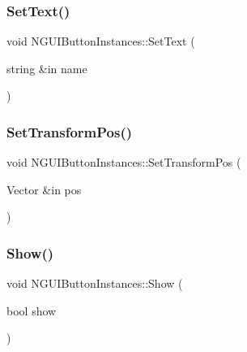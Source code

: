 \hypertarget{class_n_g_u_i_button_instances_af2efec3abac4dab2d8021a1288b4c5eb}{}\label{class_n_g_u_i_button_instances_af2efec3abac4dab2d8021a1288b4c5eb} 
\subsubsection{\texorpdfstring{Set\+Text()}{SetText()}}
{\footnotesize\ttfamily void N\+G\+U\+I\+Button\+Instances\+::\+Set\+Text (\begin{DoxyParamCaption}\item[{string \&in}]{name }\end{DoxyParamCaption})}

\hypertarget{class_n_g_u_i_button_instances_a34c1a2c7f07f6fc2d596745f62f32d7c}{}\label{class_n_g_u_i_button_instances_a34c1a2c7f07f6fc2d596745f62f32d7c} 
\subsubsection{\texorpdfstring{Set\+Transform\+Pos()}{SetTransformPos()}}
{\footnotesize\ttfamily void N\+G\+U\+I\+Button\+Instances\+::\+Set\+Transform\+Pos (\begin{DoxyParamCaption}\item[{Vector \&in}]{pos }\end{DoxyParamCaption})}

\hypertarget{class_n_g_u_i_button_instances_aae751479e9376853d489a50a4bc2186c}{}\label{class_n_g_u_i_button_instances_aae751479e9376853d489a50a4bc2186c} 
\subsubsection{\texorpdfstring{Show()}{Show()}}
{\footnotesize\ttfamily void N\+G\+U\+I\+Button\+Instances\+::\+Show (\begin{DoxyParamCaption}\item[{bool}]{show }\end{DoxyParamCaption})}



